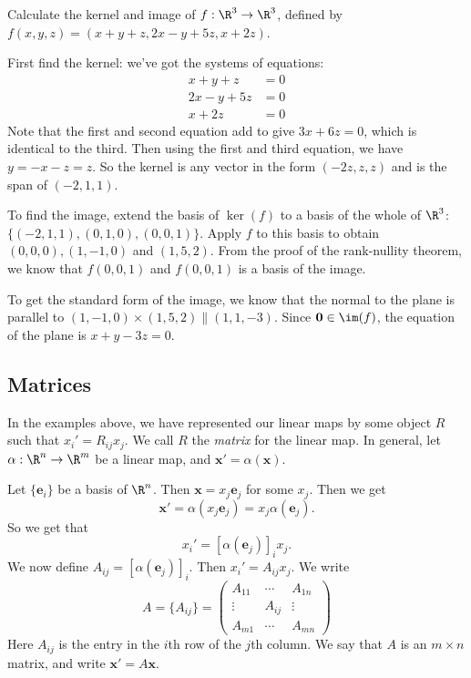\documentclass[a4paper]{article}
\begin{document}
\begin{eg}
  Calculate the kernel and image of $f:\R^3\to \R^3$, defined by $f(x, y, z) = (x + y + z, 2x - y+ 5z, x + 2z)$.

  First find the kernel: we've got the systems of equations:
  \begin{align*}
    x + y + z &= 0\\
    2x - y + 5z &= 0\\
    x + 2z  &= 0
  \end{align*}
  Note that the first and second equation add to give $3x + 6z = 0$, which is identical to the third. Then using the first and third equation, we have $y = -x - z = z$. So the kernel is any vector in the form $(-2z, z, z)$ and is the span of $(-2, 1, 1)$.

  To find the image, extend the basis of $\ker(f)$ to a basis of the whole of $\R^3$: $\{(-2, 1, 1), (0, 1, 0), (0, 0, 1)\}$. Apply $f$ to this basis to obtain $(0, 0, 0), (1, -1, 0)$ and $(1, 5, 2)$. From the proof of the rank-nullity theorem, we know that $f(0, 0, 1)$ and $f(0, 0, 1)$ is a basis of the image.

  To get the standard form of the image, we know that the normal to the plane is parallel to $(1, -1, 0)\times (1, 5, 2) \parallel (1, 1, -3)$. Since $\mathbf{0}\in \im (f)$, the equation of the plane is $x + y - 3z = 0$.
\end{eg}

\subsection{Matrices}
In the examples above, we have represented our linear maps by some object $R$ such that $x_i' = R_{ij}x_j$. We call $R$ the \emph{matrix} for the linear map. In general, let $\alpha: \R^n \to \R^m$ be a linear map, and $\mathbf{x}' = \alpha(\mathbf{x})$.

Let $\{\mathbf{e}_i\}$ be a basis of $\R^n$. Then $\mathbf{x} = x_j \mathbf{e}_j$ for some $x_j$. Then we get
\[
  \mathbf{x}' = \alpha(x_j \mathbf{e}_j) = x_j \alpha(\mathbf{e}_j).
\]
So we get that
\[
  x_i' = [\alpha(\mathbf{e}_j)]_i x_j.
\]
We now define $A_{ij} = [\alpha(\mathbf{e}_j)]_i$. Then $x_i' = A_{ij}x_j$. We write
\[
  A = \{A_{ij}\} =
  \begin{pmatrix}
    A_{11} & \cdots & A_{1n}\\
    \vdots & A_{ij} & \vdots\\
    A_{m1} & \cdots & A_{mn}
  \end{pmatrix}
\]
Here $A_{ij}$ is the entry in the $i$th row of the $j$th column. We say that $A$ is an $m\times n$ matrix, and write $\mathbf{x}' = A\mathbf{x}$.
\end{document}
